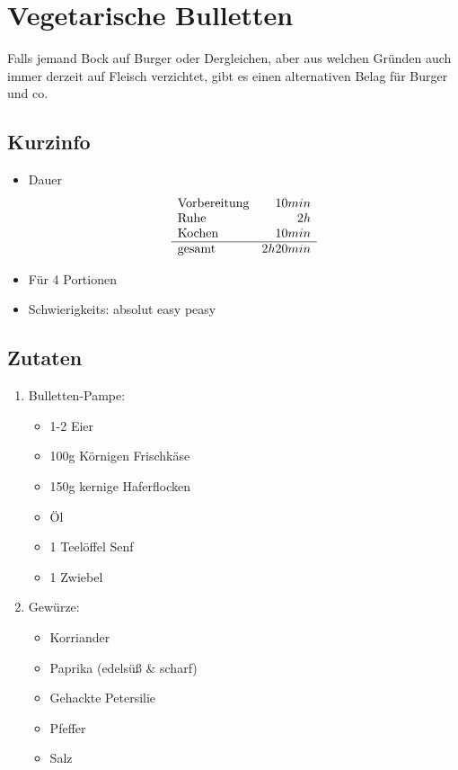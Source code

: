 \section{Vegetarische Bulletten}
  \label{Haupt:Vegetarische_Bulletten}
  Falls jemand Bock auf Burger oder Dergleichen, aber aus welchen Gründen auch
  immer derzeit auf Fleisch verzichtet, gibt es einen alternativen Belag für
  Burger und co.

  \subsection*{Kurzinfo}
    \begin{itemize}
      \item Dauer
        \begin{displaymath}
          \begin{array}{l r}
            \text{Vorbereitung}& 10min \\
            \text{Ruhe}& 2h\\
            \text{Kochen}& 10 min\\ \hline
            \text{gesamt}& 2h20min
          \end{array}
        \end{displaymath}
      \item Für 4 Portionen
      \item Schwierigkeits: absolut easy peasy
    \end{itemize}
  \subsection*{Zutaten}
    \begin{enumerate} 
      \item Bulletten-Pampe:
      \begin{itemize}
        \item 1-2 Eier
        \item 100g Körnigen Frischkäse
        \item 150g kernige Haferflocken
        \item Öl
        \item 1 Teelöffel Senf
        \item 1 Zwiebel
      \end{itemize}
      \item Gewürze:
      \begin{itemize}
        \item Korriander
        \item Paprika (edelsüß \& scharf)
        \item Gehackte Petersilie
        \item Pfeffer
        \item Salz
      \end{itemize}
    \end{enumerate}

